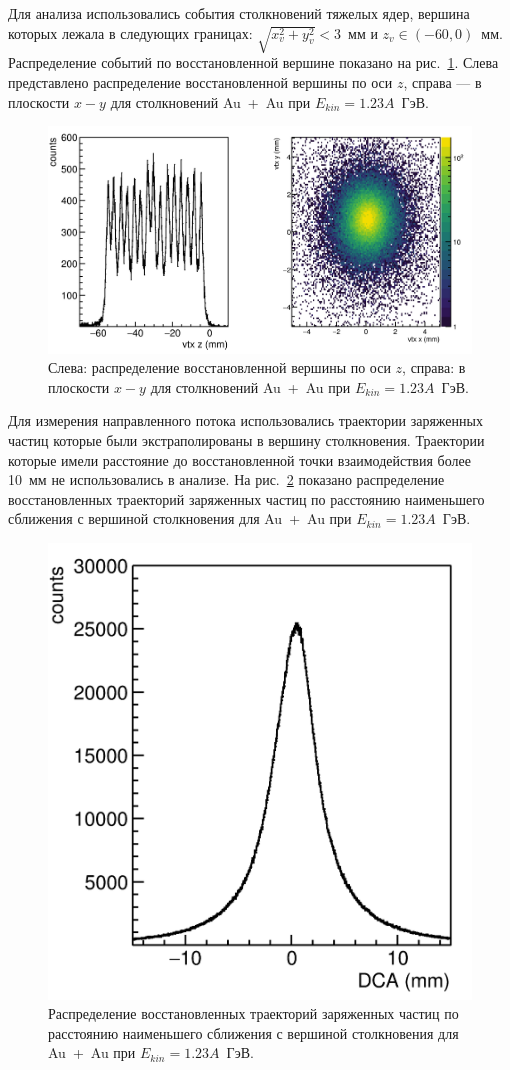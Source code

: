 Для анализа использовались события столкновений тяжелых ядер, вершина которых лежала в следующих границах: $\sqrt{x_v^2+y_v^2}<3$~мм и $z_v \in (-60, 0)$~мм.
Распределение событий по восстановленной вершине показано на рис.~\ref{fig:hades_vertex}.
Слева представлено распределение восстановленной вершины по оси $z$, справа --- в плоскости $x-y$ для столкновений Au~+~Au при $E_{kin}=1.23A$~ГэВ.
\begin{figure}[ht]
    \begin{center}
        \includegraphics[width=0.95\linewidth]{images/hades_vertex.png}
        \caption{Слева: распределение восстановленной вершины по оси $z$, справа: в плоскости $x-y$ для столкновений Au~+~Au при $E_{kin}=1.23A$~ГэВ.}
        \label{fig:hades_vertex}
    \end{center}
\end{figure}

Для измерения направленного потока использовались траектории заряженных частиц которые были экстраполированы в вершину столкновения.
Траектории которые имели расстояние до восстановленной точки взаимодействия более 10~мм не использовались в анализе.
На рис.~\ref{fig:hades_dca} показано распределение восстановленных траекторий заряженных частиц по расстоянию наименьшего сближения с вершиной столкновения для Au~+~Au при $E_{kin}=1.23A$~ГэВ.
\begin{figure}[ht]
    \begin{center}
        \includegraphics[width=0.55\linewidth]{images/hades_dca.png}
        \caption{Распределение восстановленных траекторий заряженных частиц по расстоянию наименьшего сближения с вершиной столкновения для Au~+~Au при $E_{kin}=1.23A$~ГэВ.}
        \label{fig:hades_dca}
    \end{center}
\end{figure}


